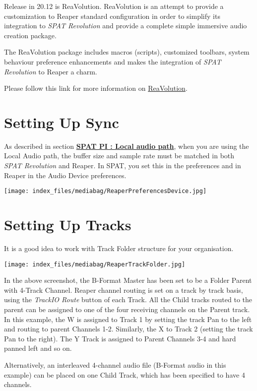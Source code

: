 \documentclass[
  letterpaper,
  DIV=11,
  numbers=noendperiod]{scrreport}
\begin{document}
Release in 20.12 is ReaVolution. ReaVolution is an attempt to provide a
customization to Reaper standard configuration in order to simplify its
integration to \emph{SPAT Revolution} and provide a complete simple
immersive audio creation package.

The ReaVolution package includes macros (scripts), customized toolbars,
system behaviour preference enhancements and makes the integration of
\emph{SPAT Revolution} to Reaper a charm.

Please follow this link for more information on
\href{Third_Party_ReaVolution.md}{ReaVolution}.

\hypertarget{setting-up-sync}{%
\section{Setting Up Sync}\label{setting-up-sync}}

As described in section
\textbf{\href{Ecosystem_\&_integration_DAW_Automation_Local_Audio_Path.md}{SPAT
PI : Local audio path}}, when you are using the Local Audio path, the
buffer size and sample rate must be matched in both \emph{SPAT
Revolution} and Reaper. In SPAT, you set this in the preferences and in
Reaper in the Audio Device preferences.

\texttt{[image: index\_files/mediabag/ReaperPreferencesDevice.jpg]}

\hypertarget{setting-up-tracks}{%
\section{Setting Up Tracks}\label{setting-up-tracks}}

It is a good idea to work with Track Folder structure for your
organisation.

\texttt{[image: index\_files/mediabag/ReaperTrackFolder.jpg]}

In the above screenshot, the B-Format Master has been set to be a Folder
Parent with 4-Track Channel. Reaper channel routing is set on a track by
track basis, using the \emph{TrackIO Route} button of each Track. All
the Child tracks routed to the parent can be assigned to one of the four
receiving channels on the Parent track. In this example, the W is
assigned to Track 1 by setting the track Pan to the left and routing to
parent Channels 1-2. Similarly, the X to Track 2 (setting the track Pan
to the right). The Y Track is assigned to Parent Channels 3-4 and hard
panned left and so on.

Alternatively, an interleaved 4-channel audio file (B-Format audio in
this example) can be placed on one Child Track, which has been specified
to have 4 channels.
\end{document}
